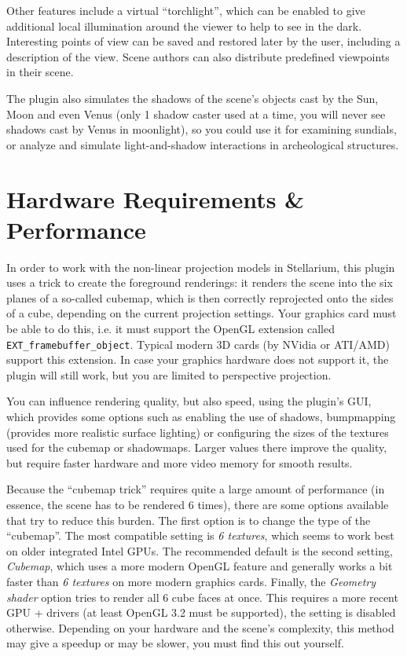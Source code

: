 \documentclass[a4paper]{article}
\begin{document}
Other features include a virtual ``torchlight'', which can be enabled to give
additional local illumination around the viewer to help to see in the dark.
Interesting points of view can be saved and restored later by the user,
including a description of the view. Scene authors can also distribute
predefined viewpoints in their scene.

The plugin also simulates the shadows of the scene's objects cast by
the Sun, Moon and even Venus (only 1 shadow caster used at a time, you
will never see shadows cast by Venus in moonlight), so you could use
it for examining sundials, or analyze and simulate light-and-shadow
interactions in archeological structures.

\section{Hardware Requirements \& Performance}
\label{sec:HardwareRequirements}

In order to work with the non-linear projection models in Stellarium,
this plugin uses a trick to create the foreground renderings: it
renders the scene into the six planes of a so-called cubemap, which is
then correctly reprojected onto the sides of a cube, depending on the
current projection settings. Your graphics card must be able to do
this, i.e. it must support the OpenGL extension called
\texttt{EXT\_framebuffer\_object}. Typical modern 3D cards (by NVidia
or ATI/AMD) support this extension. In case your graphics hardware
does not support it, the plugin will still work, but you are limited
to perspective projection.

You can influence rendering quality, but also speed, using the plugin's 
GUI, which provides some options such as enabling the use
of shadows, bumpmapping (provides more realistic surface lighting) or 
configuring the sizes of the textures used
for the cubemap or shadowmaps. Larger values there improve the quality,
but require faster hardware and more video memory for smooth results.

Because the ``cubemap trick'' requires quite a large amount of performance (in
essence, the scene has to be rendered 6 times), there are some options available
that try to reduce this burden. The first option is to change the type of the
``cubemap''. The most compatible setting is \emph{6 textures}, which seems to
work best on older integrated Intel GPUs. The recommended default is the second
setting, \emph{Cubemap}, which uses a more modern OpenGL feature and generally
works a bit faster than \emph{6 textures} on more modern graphics cards. Finally,
the \emph{Geometry shader} option tries to render all 6 cube faces at once. This
requires a more recent GPU + drivers (at least OpenGL 3.2 must be supported),
the setting is disabled otherwise. Depending on your hardware and the scene's
complexity, this method may give a speedup or may be slower, you must find this out yourself.
\end{document}
